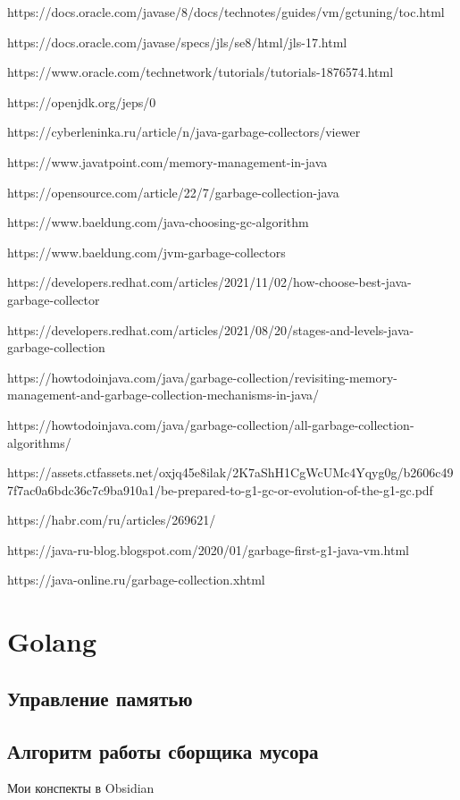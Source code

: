 https://docs.oracle.com/javase/8/docs/technotes/guides/vm/gctuning/toc.html

https://docs.oracle.com/javase/specs/jls/se8/html/jls-17.html

https://www.oracle.com/technetwork/tutorials/tutorials-1876574.html



https://openjdk.org/jeps/0



https://cyberleninka.ru/article/n/java-garbage-collectors/viewer



https://www.javatpoint.com/memory-management-in-java

https://opensource.com/article/22/7/garbage-collection-java

https://www.baeldung.com/java-choosing-gc-algorithm

https://www.baeldung.com/jvm-garbage-collectors

https://developers.redhat.com/articles/2021/11/02/how-choose-best-java-garbage-collector

https://developers.redhat.com/articles/2021/08/20/stages-and-levels-java-garbage-collection

https://howtodoinjava.com/java/garbage-collection/revisiting-memory-management-and-garbage-collection-mechanisms-in-java/

https://howtodoinjava.com/java/garbage-collection/all-garbage-collection-algorithms/



https://assets.ctfassets.net/oxjq45e8ilak/2K7aShH1CgWcUMc4Yqyg0g/b2606c497f7ac0a6bdc36c7c9ba910a1/be-prepared-to-g1-gc-or-evolution-of-the-g1-gc.pdf



https://habr.com/ru/articles/269621/

https://java-ru-blog.blogspot.com/2020/01/garbage-first-g1-java-vm.html

https://java-online.ru/garbage-collection.xhtml



\section{Golang}
\subsection{Управление памятью}
\subsection{Алгоритм работы сборщика мусора}
Мои конспекты в Obsidian


